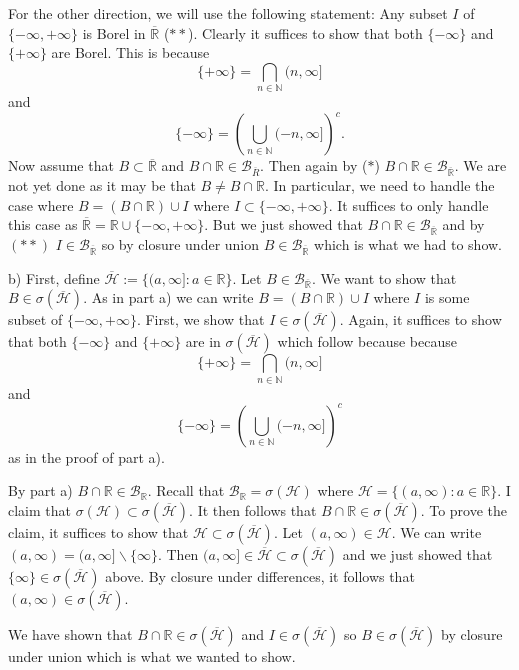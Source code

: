 \documentclass[12pt]{amsart} %
\def\N{\mathbb{N}}
\def\R{\mathbb{R}}
\def\B{\mathcal{B}}
\def\H{\mathcal{H}}
\begin{document}
For the other direction, we will use the following statement: Any subset $I$ of $\{-\infty,+\infty\}$ is Borel in $\overline{\R}$ ($**$). Clearly it suffices to show that both $\{-\infty\}$ and $\{+\infty\}$ are Borel. This is because $$\{+\infty\} = \bigcap_{n \in \N}(n, \infty]$$ and $$\{-\infty\} = \left(  \bigcup_{n \in \N} (-n, \infty] \right)^c.$$ Now assume that $B \subset \overline{\R}$ and $B \cap \R \in \B_{\overline{R}}$. Then again by ($*$) $B \cap \R \in \B_{\overline{\R}}$. We are not yet done as it may be that $B \neq B \cap \R$. In particular, we need to handle the case where  $B = (B \cap \R) \cup I$ where  $I \subset \{-\infty, +\infty\}$. It suffices to only handle this case as $\overline{\R} = \R \cup \{-\infty, +\infty\}$. But we just showed that $B \cap \R \in \B_{\overline{\R}}$ and by $\left( ** \right)$ $I \in \B_{\overline{\R}}$ so by closure under union $B \in \B_{\overline{\R}}$ which is what we had to show. 
 

\smallskip
b) First, define $\overline{\H} := \{(a,\infty]: a \in \R\}$. Let $B \in \B_{\overline{\R}}$. We want to show that $B \in \sigma\left( \overline{\H} \right)$. As in part a) we can write $B = (B \cap \R) \cup I$ where $I$ is some subset of $\{-\infty, +\infty\}$. First, we show that $I \in \sigma\left( \overline{\H} \right)$. Again, it suffices to show that both $\{-\infty\}$ and $\{+\infty\}$ are in $\sigma\left( \overline{\H} \right)$ which follow because  because $$\{+\infty\} = \bigcap_{n \in \N}(n, \infty]$$ and $$\{-\infty\} = \left(  \bigcup_{n \in \N} (-n, \infty] \right)^c$$ as in the proof of part a). 

By part a) $B \cap \R \in \B_{\R}$. Recall that $\B_{\R} = \sigma\left( \H \right)$ where $\H = \{(a, \infty) : a \in \R\}$. I claim that $\sigma(\H) \subset \sigma(\overline{\H})$. It then follows that $B \cap \R \in \sigma(\overline{\H})$. To prove the claim, it suffices to show that $\H \subset \sigma\left( \overline{\H} \right)$. Let $\left( a, \infty \right) \in \H$. We can write $(a, \infty) = (a, \infty] \backslash \{\infty\}$. Then $(a, \infty] \in \overline{\H} \subset \sigma\left( \overline{\H} \right)$ and we just showed that $\{\infty\} \in \sigma\left( \overline{\H} \right)  $ above. By closure under differences, it follows that $(a, \infty) \in \sigma(\overline{\H})$. 

We have shown that $B \cap \R \in \sigma(\overline{\H})$ and $I \in \sigma\left( \overline{\H} \right) $ so $B \in \sigma(\overline{\H})$ by closure under union which is what we wanted to show. 
\end{document}
